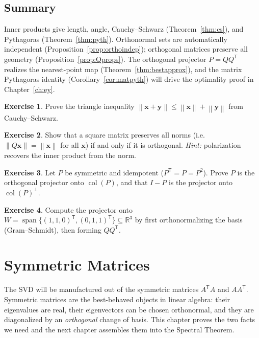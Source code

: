 \documentclass[11pt,oneside]{book}
\theoremstyle{plain}
\theoremstyle{definition}
\newtheorem{exercise}{Exercise}[chapter]
\theoremstyle{remark}
\newcommand{\R}{\mathbb{R}}
\newcommand{\col}{\operatorname{col}}
\newcommand{\spn}{\operatorname{span}}
\newcommand{\norm}[1]{\left\lVert #1 \right\rVert}
\newcommand{\T}{^{\mathsf T}}
\newcommand{\bx}{\mathbf{x}}
\newcommand{\by}{\mathbf{y}}
\begin{document}
\section*{Summary}
Inner products give length, angle, Cauchy--Schwarz (Theorem~\ref{thm:cs}), and Pythagoras
(Theorem~\ref{thm:pyth}). Orthonormal sets are automatically independent
(Proposition~\ref{prop:orthoindep}); orthogonal matrices preserve all geometry
(Proposition~\ref{prop:Qprops}). The orthogonal projector $P=QQ\T$ realizes the
nearest-point map (Theorem~\ref{thm:bestapprox}), and the matrix Pythagoras identity
(Corollary~\ref{cor:matpyth}) will drive the optimality proof in Chapter~\ref{ch:ey}.

\begin{exercise}
Prove the triangle inequality $\norm{\bx+\by}\le\norm{\bx}+\norm{\by}$ from
Cauchy--Schwarz.
\end{exercise}
\begin{exercise}
Show that a square matrix preserves all norms (i.e.\ $\norm{Q\bx}=\norm{\bx}$ for all
$\bx$) if and only if it is orthogonal. \emph{Hint:} polarization recovers the inner
product from the norm.
\end{exercise}
\begin{exercise}
Let $P$ be symmetric and idempotent ($P\T=P=P^2$). Prove $P$ is the orthogonal projector
onto $\col(P)$, and that $I-P$ is the projector onto $\col(P)^\perp$.
\end{exercise}
\begin{exercise}
Compute the projector onto $W=\spn\{(1,1,0)\T,(0,1,1)\T\}\subseteq\R^3$ by first
orthonormalizing the basis (Gram--Schmidt), then forming $QQ\T$.
\end{exercise}

\chapter{Symmetric Matrices}\label{ch:sym}

\begin{intuition_box}
The SVD will be manufactured out of the symmetric matrices $A\T A$ and $AA\T$. Symmetric
matrices are the best-behaved objects in linear algebra: their eigenvalues are real,
their eigenvectors can be chosen orthonormal, and they are diagonalized by an
\emph{orthogonal} change of basis. This chapter proves the two facts we need and the
next chapter assembles them into the Spectral Theorem.
\end{intuition_box}
\end{document}

